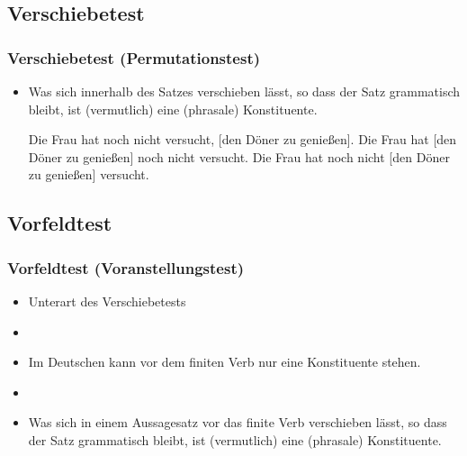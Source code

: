 \subsection{Verschiebetest}

\begin{frame}
\frametitle{Verschiebetest (Permutationstest)}

\begin{itemize}
	\item Was sich innerhalb des Satzes verschieben lässt, so dass der Satz grammatisch bleibt, ist (vermutlich) eine (phrasale) Konstituente.

	\eal 
	\zl

\pause	
	\eal 
	\ex Die Frau hat noch nicht versucht, \alert{[den Döner zu genießen]}.
	\ex Die Frau hat \alert{[den Döner zu genießen]} noch nicht versucht.
	\ex Die Frau hat noch nicht \alert{[den Döner zu genießen]} versucht.
	\zl

\end{itemize}

\end{frame}


\subsection{Vorfeldtest}


\begin{frame}
\frametitle{Vorfeldtest (Voranstellungstest)}

\begin{itemize}
	\item Unterart des Verschiebetests
	\item[]
	\item Im Deutschen kann vor dem finiten Verb nur eine Konstituente stehen. 
	\item[]
	\item Was sich in einem Aussagesatz vor das finite Verb verschieben lässt, so dass der Satz grammatisch bleibt, ist (vermutlich) eine (phrasale) Konstituente.

\end{itemize}

\end{frame}


